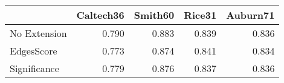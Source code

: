\begin{tabular}{lrrrr}
\toprule
{} & Caltech36 & Smith60 & Rice31 & Auburn71 \\
\midrule
No Extension &     0.790 &   0.883 &  0.839 &    0.836 \\
EdgesScore   &     0.773 &   0.874 &  0.841 &    0.834 \\
Significance &     0.779 &   0.876 &  0.837 &    0.836 \\
\bottomrule
\end{tabular}

